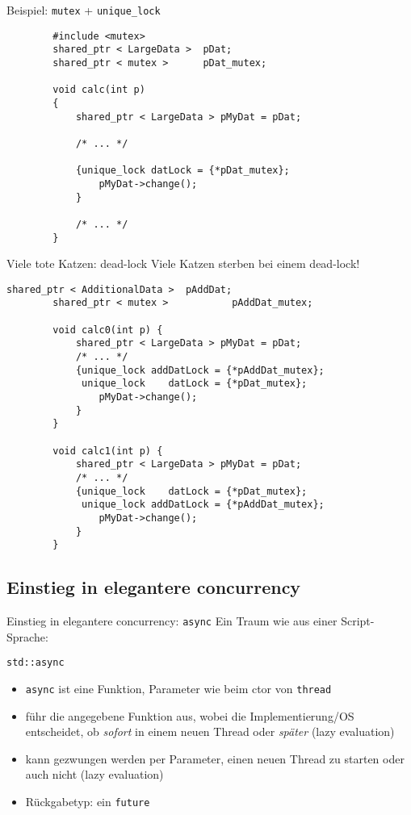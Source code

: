 \begin{frame}[fragile]{ Beispiel: \texttt{mutex} + \texttt{unique\_lock} }
	\begin{lstlisting}
		#include <mutex>
		shared_ptr < LargeData >  pDat;
		shared_ptr < mutex >      pDat_mutex;
		
		void calc(int p)
		{
			shared_ptr < LargeData > pMyDat = pDat;
			
			/* ... */
			
			{unique_lock datLock = {*pDat_mutex};
				pMyDat->change();
			}
			
			/* ... */
		}
	\end{lstlisting}
\end{frame}

\begin{frame}[fragile]{ Viele tote Katzen: dead-lock }
	\alert{Viele Katzen sterben bei einem dead-lock!}
	
	\begin{lstlisting}[basicstyle=\scriptsize]
		shared_ptr < AdditionalData >  pAddDat;
		shared_ptr < mutex >           pAddDat_mutex;
		
		void calc0(int p) {
			shared_ptr < LargeData > pMyDat = pDat;
			/* ... */
			{unique_lock addDatLock = {*pAddDat_mutex};
			 unique_lock    datLock = {*pDat_mutex};
				pMyDat->change();
			}
		}
		
		void calc1(int p) {
			shared_ptr < LargeData > pMyDat = pDat;
			/* ... */
			{unique_lock    datLock = {*pDat_mutex};
			 unique_lock addDatLock = {*pAddDat_mutex};
				pMyDat->change();
			}
		}
	\end{lstlisting}
\end{frame}


\subsection{Einstieg in elegantere concurrency}

\begin{frame}{Einstieg in elegantere concurrency: \texttt{async}}
	Ein Traum wie aus einer Script-Sprache:
	\begin{block}{ \texttt{std::async} }
		\begin{itemize}
			\item \texttt{async} ist eine Funktion, Parameter wie beim ctor von \texttt{thread}
			\item führ die angegebene Funktion aus, wobei die Implementierung/OS entscheidet, ob \emph{sofort} in einem neuen Thread oder \emph{später} (lazy evaluation)
			\item kann gezwungen werden per Parameter, einen neuen Thread zu starten oder auch nicht (lazy evaluation)
			\item Rückgabetyp: ein \texttt{future}
		\end{itemize}
	\end{block}
\end{frame}

